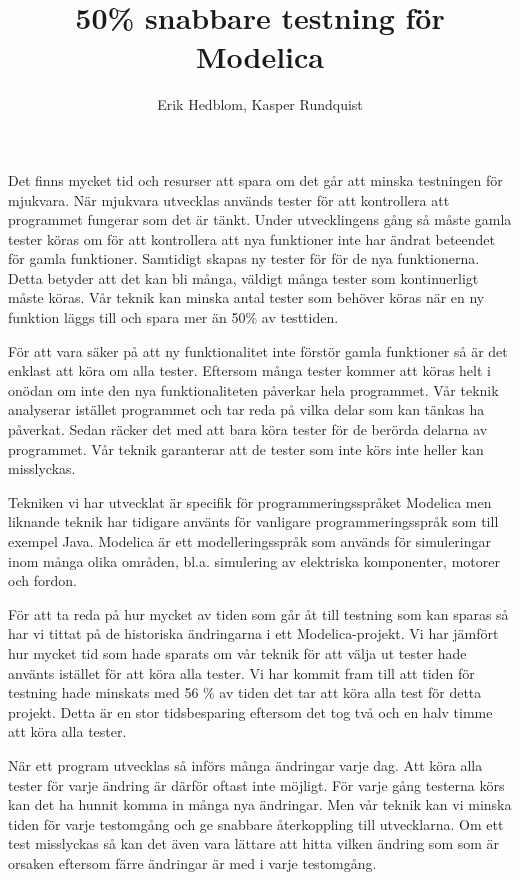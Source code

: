 \documentclass{popsci}
\author{Erik Hedblom, Kasper Rundquist}
\title{50\% snabbare testning för Modelica}
\begin{document}


{\noindent Det finns mycket tid och resurser att spara om det går att minska testningen för mjukvara. När mjukvara utvecklas används tester för att kontrollera att programmet fungerar som det är tänkt. Under utvecklingens gång så måste gamla tester köras om för att kontrollera att nya funktioner inte har ändrat beteendet för gamla funktioner. Samtidigt skapas ny tester för för de nya funktionerna. Detta betyder att det kan bli många, väldigt många tester som kontinuerligt måste köras. Vår teknik kan minska antal tester som behöver köras när en ny funktion läggs till och spara mer än 50\% av testtiden. 

För att vara säker på att ny funktionalitet inte förstör gamla funktioner så är det enklast att köra om alla tester. %
Eftersom många tester kommer att köras helt i onödan om inte den nya funktionaliteten påverkar hela programmet. Vår teknik analyserar istället programmet och tar reda på vilka delar som kan tänkas ha påverkat. Sedan räcker det med att bara köra tester för de berörda delarna av programmet. Vår teknik garanterar att de tester som inte körs inte heller kan misslyckas.

Tekniken vi har utvecklat är specifik för programmeringsspråket Modelica men liknande teknik har tidigare använts för vanligare programmeringsspråk som till exempel Java. Modelica är ett modelleringsspråk som används för simuleringar inom många olika områden, bl.a. simulering av elektriska komponenter, motorer och fordon. 

För att ta reda på hur mycket av tiden som går åt till testning som kan sparas så har vi tittat på de historiska ändringarna i ett Modelica-projekt. Vi har jämfört hur mycket tid som hade sparats om vår teknik för att välja ut tester hade använts istället för att köra alla tester. Vi har kommit fram till att tiden för testning hade minskats med 56 \% av tiden det tar att köra alla test för detta projekt. Detta är en stor tidsbesparing eftersom det tog två och en halv timme att köra alla tester.

När ett program utvecklas så införs många ändringar varje dag. Att köra alla tester för varje ändring är därför oftast inte möjligt. För varje gång testerna körs kan det ha hunnit komma in många nya ändringar. Men vår teknik kan vi minska tiden för varje testomgång och ge snabbare återkoppling till utvecklarna. Om ett test misslyckas så kan det även vara lättare att hitta vilken ändring som som är orsaken eftersom färre ändringar är med i varje testomgång. 
}
\end{document}
